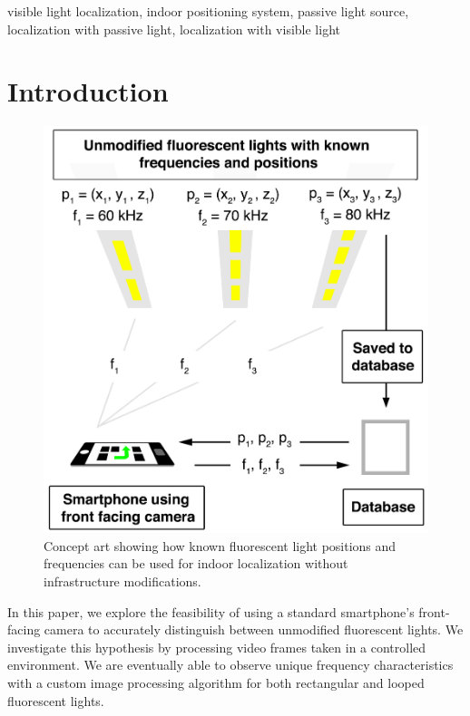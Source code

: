 \documentclass[conference]{IEEEtran}
\begin{document}
\begin{IEEEkeywords}
visible light localization, indoor positioning system, passive light source, localization with passive light, localization with visible light
\end{IEEEkeywords}

\section{Introduction}\label{section:introduction}

\begin{figure}
\centerline{\includegraphics[width=1.0\columnwidth]{figures/concept.jpg}}
	\caption{Concept art showing how known fluorescent light positions and frequencies can be used for indoor localization without infrastructure modifications.}
	\label{fig:poc}
\end{figure}

In this paper, we explore the feasibility of using a standard smartphone's front-facing camera to accurately distinguish between unmodified fluorescent lights. We investigate this hypothesis by processing video frames taken in a controlled environment. We are eventually able to observe unique frequency characteristics with a custom image processing algorithm for both rectangular and looped fluorescent lights.
\end{document}
